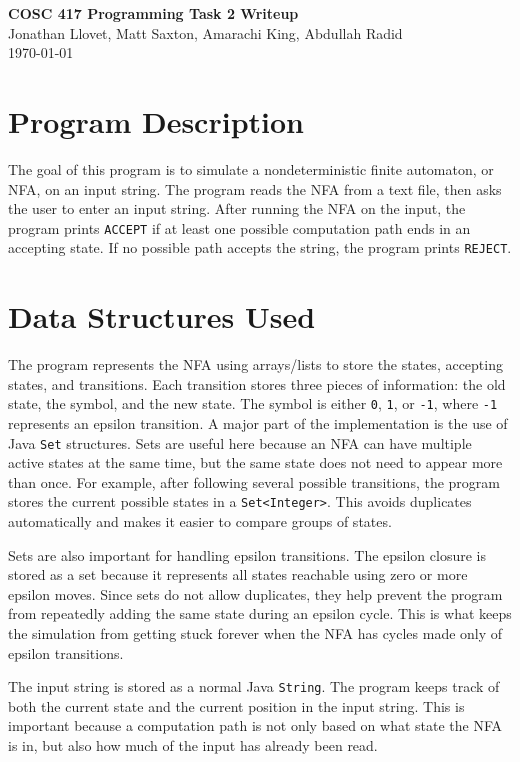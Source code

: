 \documentclass[12pt]{article}
\begin{document}
\begin{center}
    \Large \textbf{COSC 417 Programming Task 2 Writeup} \\[0.2in]
    \normalsize
    Jonathan Llovet, Matt Saxton, Amarachi King, Abdullah Radid \\[0.1in]
    \today
\end{center}

\section*{Program Description}

The goal of this program is to simulate a nondeterministic finite automaton, or NFA, on an input string. The program reads the NFA from a text file, then asks the user to enter an input string. After running the NFA on the input, the program prints \texttt{ACCEPT} if at least one possible computation path ends in an accepting state. If no possible path accepts the string, the program prints \texttt{REJECT}.


\section*{Data Structures Used}

The program represents the NFA using arrays/lists to store the states, accepting states, and transitions. Each transition stores three pieces of information: the old state, the symbol, and the new state. The symbol is either \texttt{0}, \texttt{1}, or \texttt{-1}, where \texttt{-1} represents an epsilon transition. A major part of the implementation is the use of Java \texttt{Set} structures. Sets are useful here because an NFA can have multiple active states at the same time, but the same state does not need to appear more than once. For example, after following several possible transitions, the program stores the current possible states in a \texttt{Set<Integer>}. This avoids duplicates automatically and makes it easier to compare groups of states.

Sets are also important for handling epsilon transitions. The epsilon closure is stored as a set because it represents all states reachable using zero or more epsilon moves. Since sets do not allow duplicates, they help prevent the program from repeatedly adding the same state during an epsilon cycle. This is what keeps the simulation from getting stuck forever when the NFA has cycles made only of epsilon transitions.

The input string is stored as a normal Java \texttt{String}. The program keeps track of both the current state and the current position in the input string. This is important because a computation path is not only based on what state the NFA is in, but also how much of the input has already been read.
\end{document}
